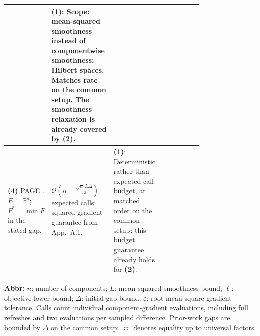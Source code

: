 \begin{table}[tp]
\begin{threeparttable}
\begin{tabularx}{\linewidth}{@{}>{\raggedright\arraybackslash}p{0.20\linewidth}>{\raggedright\arraybackslash}p{0.32\linewidth}>{\raggedright\arraybackslash}p{0.25\linewidth}>{\raggedright\arraybackslash}X@{}}
& \textbf{(1)}: Scope: mean-squared smoothness instead of componentwise smoothness; Hilbert spaces. Matches rate on the common setup. The smoothness relaxation is already covered by \textbf{(2)}.
& \\
\midrule
\textbf{(4)} PAGE \citep[Thm.~1, Cor.~2; App.~A.1, Eq.~(23)]{fsncLi2021PAGE}. $E=\mathbb{R}^d$; $F^*=\min F$ in the stated gap.
& $\mathcal{O}\!\left(n+\frac{\sqrt n\,L\Delta}{\varepsilon^2}\right)$ expected calls; squared-gradient guarantee from App.~A.1.
& \textbf{(1)}: Deterministic rather than expected call budget, at matched order on the common setup; this budget guarantee already holds for \textbf{(2)}.
& \\
\bottomrule
\end{tabularx}
\begin{tablenotes}[flushleft]\footnotesize
\item[] \textbf{Abbr:} $n$: number of components; $L$: mean-squared smoothness bound; $\ell$: objective lower bound; $\Delta$: initial gap bound; $\varepsilon$: root-mean-square gradient tolerance. Calls count individual component-gradient evaluations, including full refreshes and two evaluations per sampled difference. Prior-work gaps are bounded by $\Delta$ on the common setup; $\asymp$ denotes equality up to universal factors.
\end{tablenotes}
\end{threeparttable}
\end{table}
\clearpage

